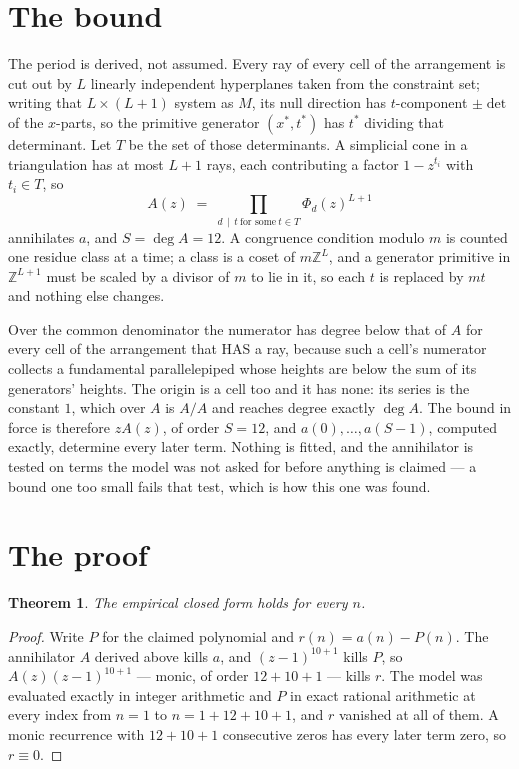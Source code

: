\documentclass[11pt,a4paper]{article}
\theoremstyle{plain}
\newtheorem{theorem}{Theorem}
\theoremstyle{definition}
\begin{document}
\section{The bound}

The period is derived, not assumed. Every ray of every cell of the arrangement is cut out by
$L$ linearly independent hyperplanes taken from the constraint set; writing that $L\times(L+1)$
system as $M$, its null direction has $t$-component $\pm\det$ of the $x$-parts, so the
primitive generator $(x^*,t^*)$ has $t^*$ dividing that determinant. Let $T$ be the set of
those determinants. A simplicial cone in a triangulation has at most $L+1$ rays, each
contributing a factor $1-z^{t_i}$ with $t_i\in T$, so
\[
A(z)\;=\;\prod_{d\,\mid\,t\ \text{for some}\ t\in T}\Phi_d(z)^{L+1}
\]
annihilates $a$, and $S=\deg A=12$. A congruence condition modulo $m$ is counted one residue
class at a time; a class is a coset of $m\mathbb{Z}^L$, and a generator primitive in
$\mathbb{Z}^{L+1}$ must be scaled by a divisor of $m$ to lie in it, so each $t$ is replaced
by $mt$ and nothing else changes.

Over the common denominator the numerator has degree below that of $A$ for every cell of the
arrangement that HAS a ray, because such a cell's numerator collects a fundamental
parallelepiped whose heights are below the sum of its generators' heights. The origin is a cell
too and it has none: its series is the constant $1$, which over $A$ is $A/A$ and reaches degree
exactly $\deg A$. The bound in force is therefore $zA(z)$, of order $S=12$, and
$a(0),\dots,a(S-1)$, computed exactly, determine every later term. Nothing is fitted, and the
annihilator is tested on terms the model was not asked for before anything is claimed --- a
bound one too small fails that test, which is how this one was found.

\section{The proof}

\begin{theorem}
The empirical closed form holds for every $n$.
\end{theorem}

\begin{proof}
Write $P$ for the claimed polynomial and $r(n)=a(n)-P(n)$. The annihilator $A$ derived above
kills $a$, and $(z-1)^{10+1}$ kills $P$, so $A(z)(z-1)^{10+1}$ --- monic, of order
$12+10+1$ --- kills $r$. The model was evaluated exactly in integer arithmetic and $P$ in
exact rational arithmetic at every index from $n=1$ to $n=1+12+10+1$, and $r$ vanished
at all of them. A monic recurrence with $12+10+1$ consecutive zeros has every later term zero,
so $r\equiv0$.
\end{proof}
\end{document}
